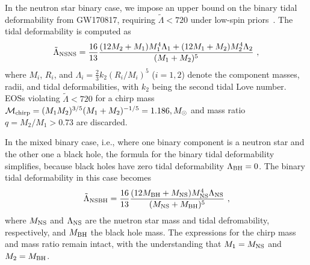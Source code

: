 \documentclass[twocolumn]{aastex631}
\begin{document}
	In the neutron star binary case, we impose an upper bound on the binary tidal deformability from GW170817, requiring $\tilde{\Lambda} < 720$ under low-spin priors~\citep{Abbott2018a}. The tidal deformability is computed as
	\begin{equation} 
		\tilde{\Lambda}_{\rm NSNS} = \frac{16}{13} \frac{ (12M_2 + M_1) M_1^4 \Lambda_1 + (12M_1 + M_2) M_2^4 \Lambda_2}{(M_1 + M_2)^5}~,
	\end{equation}
	where $M_i$, $R_i$, and $\Lambda_i = \frac{2}{3} k_2 \left( R_i/M_i \right)^5$ ($i=1,2$) denote the component masses, radii, and tidal deformabilities, with $k_2$ being the second tidal Love number.
	EOSs violating $\tilde{\Lambda} < 720$ for a chirp mass $\mathcal{M}_{\rm chirp} = (M_1 M_2)^{3/5} (M_1+M_2)^{-1/5} = 1.186,M_\odot$ and mass ratio $q = M_2/M_1 > 0.73$ are discarded.
	
	In the mixed binary case, i.e., where one binary component is a neutron star and the other one a black hole, the formula for the binary tidal deformability simplifies, because black holes have zero tidal deformability $\Lambda_{\rm BH}=0$.
	The binary tidal deformability in this case becomes
	\begin{equation} 
		\tilde{\Lambda}_{\rm NSBH} = \frac{16}{13} \frac{ (12M_{\rm BH} + M_{\rm NS}) M_{\rm NS}^4 \Lambda_{\rm NS}}{(M_{\rm NS} + M_{\rm BH})^5}~,
	\end{equation}
	where $M_{\rm NS}$ and $\Lambda_{\rm NS}$ are the nuetron star mass and tidal defromability, respectively, and $M_{\rm BH}$ the black hole mass. The expressions for the chirp mass and mass ratio remain intact, with the understanding that $M_1=M_{\rm NS}$ and $M_2=M_{\rm BH}$. 
	
	
\end{document}

